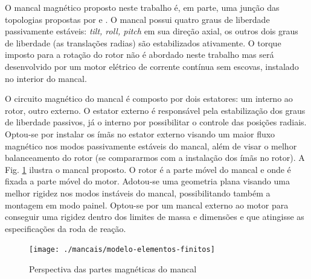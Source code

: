 
O mancal magnético proposto neste trabalho é, em parte, uma junção das topologias propostas por \citet{Bernus1998} e \citet{Scharfe2001}. O mancal possui quatro graus de liberdade passivamente estáveis: \textit{tilt, roll, pitch} em sua direção axial, os outros dois graus de liberdade (as translações radias) são estabilizados ativamente. O torque imposto para a rotação do rotor não é abordado neste trabalho mas será desenvolvido por um motor elétrico de corrente contínua sem escovas, instalado no interior do mancal.


O circuito magnético do mancal é composto por dois estatores: um interno ao rotor, outro externo. O estator externo é responsável pela estabilização dos graus de liberdade passivos, já o interno por possibilitar o controle das posições radiais. Optou-se por instalar os ímãs no estator externo visando um maior fluxo magnético nos modos passivamente estáveis do mancal, além de visar o melhor balanceamento do rotor (se compararmos com a instalação dos ímãs no rotor). A Fig. \ref{fig:mancal:topo} ilustra o mancal proposto. O rotor é a parte móvel do mancal e onde é fixada a parte móvel do motor. Adotou-se uma geometria plana visando uma melhor rigidez nos modos instáveis do mancal, possibilitando também a montagem em modo painel. Optou-se por um mancal externo ao motor para conseguir uma rigidez dentro dos limites de massa e dimensões e que atingisse as especificações  da roda de reação. 


\begin{figure}[ht!]
\centering
\texttt{[image: ./mancais/modelo-elementos-finitos]}
\caption[Corte ilustrativo do mancal magnético]{Perspectiva das partes magnéticas do mancal}
\label{fig:mancal:topo}
\end{figure}

